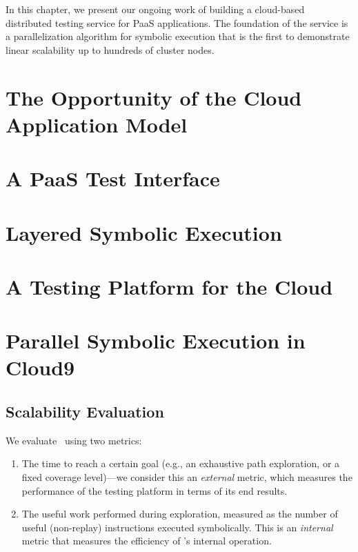 In this chapter, we present our ongoing work of building a cloud-based distributed testing service for PaaS applications.  The foundation of the service is a parallelization algorithm for symbolic execution that is the first to demonstrate linear scalability up to hundreds of cluster nodes.

\section{The Opportunity of the Cloud Application Model}


\section{A PaaS Test Interface}
\label{sec:paas:abstractions}


\section{Layered Symbolic Execution}
\label{sec:paas:layeredsymbex}


\section{A Testing Platform for the Cloud}
\label{sec:paas:fedsymbex}


\section{Parallel Symbolic Execution in Cloud9}
\label{sec:paas:parsymbex}



\subsection{Scalability Evaluation}
\label{sec:scalability}


We evaluate \cnine\ using two metrics:
\begin{enumerate}
\item The time to reach a certain goal (e.g., an exhaustive path exploration, or a fixed coverage level)---we consider this an \emph{external} metric, which measures the performance of the testing platform in terms of its end results.
\item The useful work performed during exploration, measured as the number of useful (non-replay) instructions executed symbolically. This is an \emph{internal} metric that measures the efficiency of \cnine's internal operation. 
\end{enumerate}

